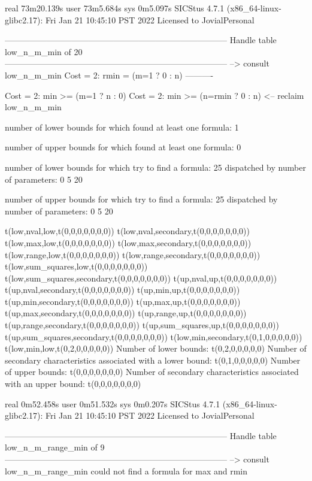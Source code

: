real	73m20.139s
user	73m5.684s
sys	0m5.097s
SICStus 4.7.1 (x86_64-linux-glibc2.17): Fri Jan 21 10:45:10 PST 2022
Licensed to JovialPersonal


--------------------------------------------------------------------------------
Handle table low_n_m_min of 20
--------------------------------------------------------------------------------
--> consult low_n_m_min
Cost =  2:  rmin = (m=1 ? 0 : n)
----------

Cost =  2:  min >= (m=1 ? n : 0)
Cost =  2:  min >= (n=rmin ? 0 : n)
<-- reclaim low_n_m_min

number of lower bounds for which found at least one formula: 1

number of upper bounds for which found at least one formula: 0

number of lower bounds for which try to find a formula: 25
dispatched by number of parameters: 0  5  20

number of upper bounds for which try to find a formula: 25
dispatched by number of parameters: 0  5  20

t(low,nval,low,t(0,0,0,0,0,0,0))
t(low,nval,secondary,t(0,0,0,0,0,0,0))
t(low,max,low,t(0,0,0,0,0,0,0))
t(low,max,secondary,t(0,0,0,0,0,0,0))
t(low,range,low,t(0,0,0,0,0,0,0))
t(low,range,secondary,t(0,0,0,0,0,0,0))
t(low,sum_squares,low,t(0,0,0,0,0,0,0))
t(low,sum_squares,secondary,t(0,0,0,0,0,0,0))
t(up,nval,up,t(0,0,0,0,0,0,0))
t(up,nval,secondary,t(0,0,0,0,0,0,0))
t(up,min,up,t(0,0,0,0,0,0,0))
t(up,min,secondary,t(0,0,0,0,0,0,0))
t(up,max,up,t(0,0,0,0,0,0,0))
t(up,max,secondary,t(0,0,0,0,0,0,0))
t(up,range,up,t(0,0,0,0,0,0,0))
t(up,range,secondary,t(0,0,0,0,0,0,0))
t(up,sum_squares,up,t(0,0,0,0,0,0,0))
t(up,sum_squares,secondary,t(0,0,0,0,0,0,0))
t(low,min,secondary,t(0,1,0,0,0,0,0))
t(low,min,low,t(0,2,0,0,0,0,0))
Number of lower bounds:                                             t(0,2,0,0,0,0,0)
Number of secondary characteristics associated with a lower bound:  t(0,1,0,0,0,0,0)
Number of upper bounds:                                             t(0,0,0,0,0,0,0)
Number of secondary characteristics associated with an upper bound: t(0,0,0,0,0,0,0)

real	0m52.458s
user	0m51.532s
sys	0m0.207s
SICStus 4.7.1 (x86_64-linux-glibc2.17): Fri Jan 21 10:45:10 PST 2022
Licensed to JovialPersonal


--------------------------------------------------------------------------------
Handle table low_n_m_range_min of 9
--------------------------------------------------------------------------------
--> consult low_n_m_range_min
could not find a formula for max and rmin

